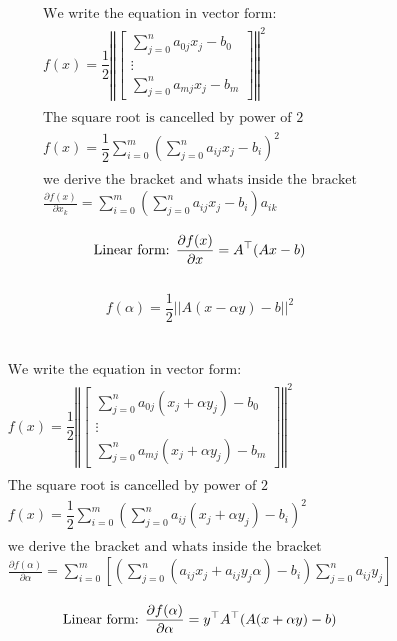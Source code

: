 \documentclass[12pt]{article}         %
\begin{document}
$$
\begin{aligned}
\text{We write the equation in vector form:}\\
f(x) = \dfrac{1}{2}\left\Vert
  \begin{bmatrix}
 \sum_{j=0}^{n}a_{0j}x_j - b_0\\
\vdots\\
  \sum_{j=0}^{n}a_{mj}x_j - b_m
   \end{bmatrix}
\right\Vert^2\\\\
\text{The square root is cancelled by power of 2}\\
f(x) = \dfrac{1}{2}\sum_{i=0}^{m}\left(\sum_{j=0}^{n}a_{ij}x_j - b_i\right)^2\\\\
\text{we derive the bracket and whats inside the bracket}\\
\frac {\partial f(x)}{\partial x_k} = \sum_{i=0}^{m}\left(\sum_{j=0}^{n}a_{ij}x_j - b_i\right)a_{ik}\\
\end{aligned}
$$
$$
\text{Linear form: }\\
	\frac {\partial f(x)}{\partial x}  = A^\top(Ax - b)
$$\\
\begin{equation}
	f(\alpha) = \dfrac{1}{2}||A(x - \alpha y) - b||^2
\end{equation}
\\
\\
$$
\begin{aligned}
\text{We write the equation in vector form:}\\
f(x) = \dfrac{1}{2}\left\Vert
  \begin{bmatrix}
 \sum_{j=0}^{n}a_{0j}(x_j + \alpha y_j) - b_0\\
\vdots\\
  \sum_{j=0}^{n}a_{mj}(x_j + \alpha y_j) - b_m
   \end{bmatrix}
\right\Vert^2\\\\
\text{The square root is cancelled by power of 2}\\
f(x) = \dfrac{1}{2}\sum_{i=0}^{m}\left(\sum_{j=0}^{n}a_{ij}(x_j + \alpha y_j) - b_i\right)^2\\\\
\text{we derive the bracket and whats inside the bracket}\\
\frac {\partial f(\alpha)}{\partial \alpha} = \sum_{i=0}^{m}\left[ \left( \sum_{j=0}^{n}(a_{ij}x_j +a_{ij}y_j\alpha) - b_i\right)\sum_{j=0}^{n}a_{ij}y_j\right]\\
\end{aligned}
$$
$$
\text{Linear form: }\\
	\frac {\partial f(\alpha)}{\partial \alpha} = y^\top A^\top(A(x +\alpha y) - b)
$$\\
\end{document}
